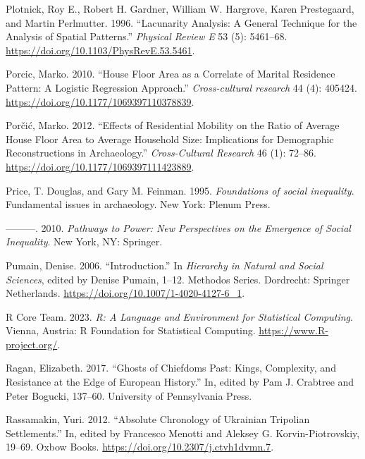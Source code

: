 \documentclass[
  12pt,
  a4paper, twoside]{book}
\newlength{\cslhangindent}
\newlength{\cslentryspacingunit} %
\newenvironment{CSLReferences}[2] %
 {%
  \setlength{\parindent}{0pt}
  \ifodd #1
  \let\oldpar\par
  \def\par{\hangindent=\cslhangindent\oldpar}
  \fi
  \setlength{\parskip}{#2\cslentryspacingunit}
 }%
 {}
\begin{document}
\begin{CSLReferences}{1}{0}
\leavevmode{}%
Plotnick, Roy E., Robert H. Gardner, William W. Hargrove, Karen Prestegaard, and Martin Perlmutter. 1996. {``Lacunarity Analysis: A General Technique for the Analysis of Spatial Patterns.''} \emph{Physical Review E} 53 (5): 5461--68. \url{https://doi.org/10.1103/PhysRevE.53.5461}.

\leavevmode{}%
Porcic, Marko. 2010. {``House Floor Area as a Correlate of Marital Residence Pattern: A Logistic Regression Approach.''} \emph{Cross-cultural research} 44 (4): 405424. \url{https://doi.org/10.1177/1069397110378839}.

\leavevmode{}%
Porčić, Marko. 2012. {``Effects of Residential Mobility on the Ratio of Average House Floor Area to Average Household Size: Implications for Demographic Reconstructions in Archaeology.''} \emph{Cross-Cultural Research} 46 (1): 72--86. \url{https://doi.org/10.1177/1069397111423889}.

\leavevmode{}%
Price, T. Douglas, and Gary M. Feinman. 1995. \emph{Foundations of social inequality}. Fundamental issues in archaeology. New York: Plenum Press.

\leavevmode{}%
---------. 2010. \emph{Pathways to Power: New Perspectives on the Emergence of Social Inequality}. New York, NY: Springer.

\leavevmode{}%
Pumain, Denise. 2006. {``Introduction.''} In \emph{Hierarchy in {Natural} and {Social Sciences}}, edited by Denise Pumain, 1--12. Methodos {Series}. {Dordrecht}: {Springer Netherlands}. \url{https://doi.org/10.1007/1-4020-4127-6_1}.

\leavevmode{}%
R Core Team. 2023. \emph{R: A Language and Environment for Statistical Computing}. Vienna, Austria: R Foundation for Statistical Computing. \url{https://www.R-project.org/}.

\leavevmode{}%
Ragan, Elizabeth. 2017. {``Ghosts of Chiefdoms Past: Kings, Complexity, and Resistance at the Edge of European History.''} In, edited by Pam J. Crabtree and Peter Bogucki, 137--60. University of Pennsylvania Press.

\leavevmode{}%
Rassamakin, Yuri. 2012. {``Absolute Chronology of Ukrainian Tripolian Settlements.''} In, edited by Francesco Menotti and Aleksey G. Korvin-Piotrovskiy, 19--69. Oxbow Books. \url{https://doi.org/10.2307/j.ctvh1dvmn.7}.


\end{CSLReferences}
\end{document}
